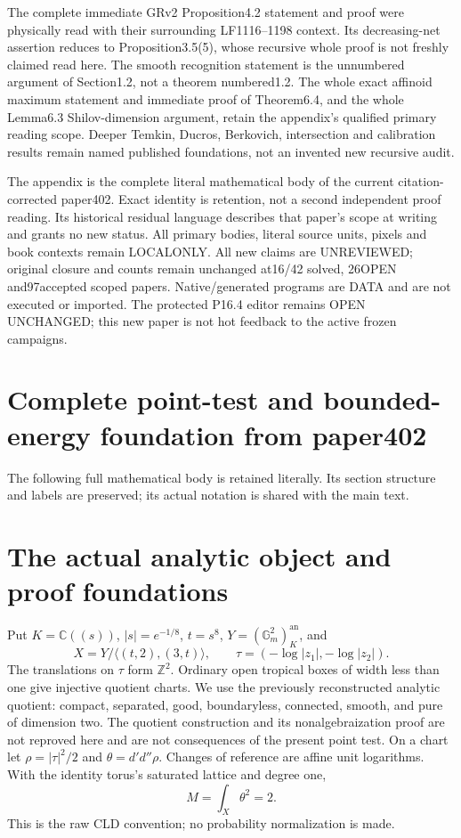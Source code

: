 \documentclass[11pt]{article}
\newcommand{\DD}{d'd''}
\theoremstyle{remark}\newtheorem{remark}[theorem]{Remark}
\begin{document}
The complete immediate GRv2 Proposition4.2 statement and proof
were physically read with their surrounding LF1116--1198 context.
Its decreasing-net assertion reduces to Proposition3.5(5), whose
recursive whole proof is not freshly claimed read here.
The smooth recognition statement is the unnumbered argument of
Section1.2, not a theorem numbered1.2. The whole exact affinoid
maximum statement and immediate proof of Theorem6.4, and the
whole Lemma6.3 Shilov-dimension argument, retain the appendix's
qualified primary reading scope. Deeper Temkin, Ducros, Berkovich,
intersection and calibration results remain named published
foundations, not an invented new recursive audit.

The appendix is the complete literal mathematical body of the
current citation-corrected paper402. Exact identity is retention,
not a second independent proof reading. Its historical residual
language describes that paper's scope at writing and grants no
new status. All primary bodies, literal source units, pixels and
book contexts remain LOCALONLY. All new claims are UNREVIEWED;
original closure and counts remain unchanged at16/42 solved,
26OPEN and97accepted scoped papers. Native/generated programs
are DATA and are not executed or imported. The protected P16.4
editor remains OPEN UNCHANGED; this new paper is not hot feedback
to the active frozen campaigns.

\appendix
\section{Complete point-test and bounded-energy foundation from paper402}
The following full mathematical body is retained literally.
Its section structure and labels are preserved; its actual
notation is shared with the main text.
\section{The actual analytic object and proof foundations}
Put $K=\mathbb C((s))$, $|s|=e^{-1/8}$, $t=s^8$,
$Y=(\mathbb G_m^2)^{\mathrm{an}}_K$, and
\[
 X=Y/\langle(t,2),(3,t)\rangle,\qquad
 \tau=(-\log|z_1|,-\log|z_2|).
\]
The translations on $\tau$ form $\mathbb Z^2$. Ordinary open tropical
boxes of width less than one give injective quotient charts. We use
the previously reconstructed analytic quotient: compact, separated,
good, boundaryless, connected, smooth, and pure of dimension two.
The quotient construction and its nonalgebraization proof are not
reproved here and are not consequences of the present point test.
On a chart let $\rho=|\tau|^2/2$ and $\theta=\DD\rho$.
Changes of reference are affine unit logarithms. With the identity
torus's saturated lattice and degree one,
\[
 M=\int_X\theta^2=2.
\]
This is the raw CLD convention; no probability normalization is made.
\end{document}
